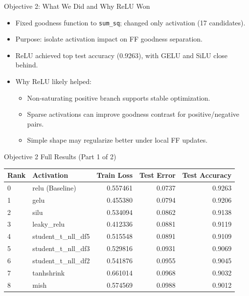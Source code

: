 \documentclass[aspectratio=169]{beamer}
\begin{document}
\begin{frame}{Objective 2: What We Did and Why ReLU Won}
\begin{itemize}
  \item Fixed goodness function to \texttt{sum\_sq}; changed only activation (17 candidates).
  \item Purpose: isolate activation impact on FF goodness separation.
  \item ReLU achieved top test accuracy (0.9263), with GELU and SiLU close behind.
  \item Why ReLU likely helped:
  \begin{itemize}
    \item Non-saturating positive branch supports stable optimization.
    \item Sparse activations can improve goodness contrast for positive/negative pairs.
    \item Simple shape may regularize better under local FF updates.
  \end{itemize}
\end{itemize}
\end{frame}

\begin{frame}{Objective 2 Full Results (Part 1 of 2)}
\scriptsize
\begin{table}[h]
\centering
\begin{tabular}{l l r r r}
\hline
Rank & Activation & Train Loss & Test Error & Test Accuracy \\
\hline
0 & relu (Baseline) & 0.557461 & 0.0737 & 0.9263 \\
1 & gelu & 0.455380 & 0.0794 & 0.9206 \\
2 & silu & 0.534094 & 0.0862 & 0.9138 \\
3 & leaky\_relu & 0.412336 & 0.0881 & 0.9119 \\
4 & student\_t\_nll\_df5 & 0.515548 & 0.0891 & 0.9109 \\
5 & student\_t\_nll\_df3 & 0.529816 & 0.0931 & 0.9069 \\
6 & student\_t\_nll\_df2 & 0.541876 & 0.0955 & 0.9045 \\
7 & tanhshrink & 0.661014 & 0.0968 & 0.9032 \\
8 & mish & 0.574569 & 0.0988 & 0.9012 \\
\hline
\end{tabular}
\end{table}
\normalsize
\end{frame}
\end{document}
